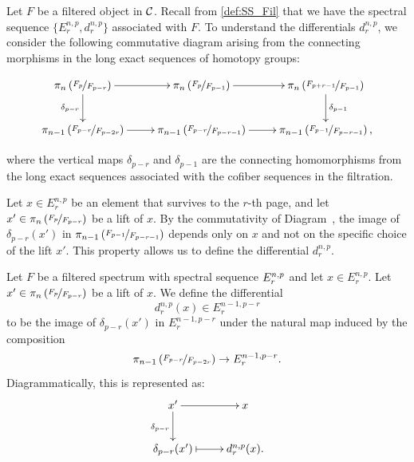 Let $F$ be a filtered object in $\mathcal{C}$. Recall from \cref{def:SS_Fil} that we have the spectral sequence $\{ E_r^{n,p}, d_r^{n,p} \}$ associated with $F$. To understand the differentials $d_r^{n,p}$, we consider the following commutative diagram arising from the connecting morphisms in the long exact sequences of homotopy groups:

\begin{equation}\label{eq:diff_well_def}
    \xymatrix{
    \pi_n\left( \nicefrac{F_p}{F_{p - r}} \right) \ar[r]\ar[d]_{\delta_{p - r}} & \pi_n\left( \nicefrac{F_p}{F_{p - 1}} \right) \ar[r] & \pi_n\left( \nicefrac{F_{p + r - 1}}{F_{p - 1}} \right) \ar[d]^{\delta_{p - 1}} \\
    \pi_{n - 1}\left( \nicefrac{F_{p - r}}{F_{p - 2r}} \right) \ar[r] & \pi_{n - 1}\left( \nicefrac{F_{p - r}}{F_{p - r - 1}} \right) \ar[r] & \pi_{n - 1}\left( \nicefrac{F_{p - 1}}{F_{p - r - 1}} \right),
    }
\end{equation}

where the vertical maps $\delta_{p - r}$ and $\delta_{p - 1}$ are the connecting homomorphisms from the long exact sequences associated with the cofiber sequences in the filtration.

Let $x \in E_r^{n,p}$ be an element that survives to the $r$-th page, and let $x' \in \pi_n\left( \nicefrac{F_p}{F_{p - r}} \right)$ be a lift of $x$. By the commutativity of Diagram~, the image of $\delta_{p - r}(x')$ in $\pi_{n - 1}\left( \nicefrac{F_{p - 1}}{F_{p - r - 1}} \right)$ depends only on $x$ and not on the specific choice of the lift $x'$. This property allows us to define the differential $d_r^{n,p}$.

\begin{defn}
    Let $F$ be a filtered spectrum with spectral sequence $E_r^{n,p}$ and let $x \in E_r^{n,p}$. Let $x' \in \pi_n\left( \nicefrac{F_p}{F_{p - r}} \right)$ be a lift of $x$. We define the differential
    \begin{equation*}
        d_r^{n,p}(x) \in E_r^{n - 1, p - r}
    \end{equation*}
    to be the image of $\delta_{p - r}(x')$ in $E_r^{n - 1, p - r}$ under the natural map induced by the composition
    \begin{equation*}
        \pi_{n - 1}\left( \nicefrac{F_{p - r}}{F_{p - 2r}} \right) \to  E_r^{n - 1, p - r}.
    \end{equation*}
    Diagrammatically, this is represented as:
    \begin{equation}\label{eq:differential_diagram}
        \xymatrix{
        x' \ar[d]_{\delta_{p - r}} & \ar@{<-}[l] x \\
        \delta_{p - r}(x') \ar@{|->}[r] & d_r^{n,p}(x).
        }
    \end{equation}
\end{defn}

